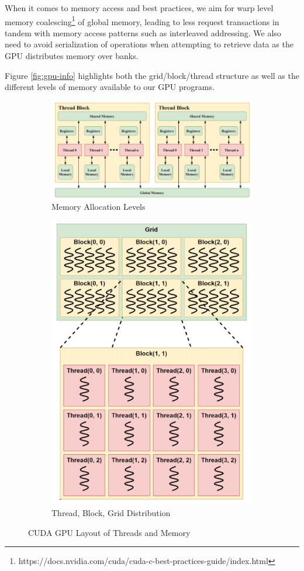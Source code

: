 \documentclass[11pt]{article}       %
\begin{document}
When it comes to memory access and best practices, we aim for warp level memory coalescing\footnote{https://docs.nvidia.com/cuda/cuda-c-best-practices-guide/index.html} of global memory, leading to less request transactions in tandem with memory access patterns such as interleaved addressing. We also need to avoid serialization of operations when attempting to retrieve data as the GPU distributes memory over banks. 

Figure \ref{fig:gpu-info} highlights both the grid/block/thread structure as well as the different levels of memory available to our GPU programs.

\begin{figure}
\begin{subfigure}{.5\textwidth}
  \centering
  \includegraphics[width=.8\linewidth]{Figures/grid_block_mem.png}  
  \caption{Memory Allocation Levels}
  \label{fig:mem-allocation}
\end{subfigure}
\begin{subfigure}{.5\textwidth}
  \centering
  \includegraphics[width=.8\linewidth]{Figures/grid_block_thread.png}  
  \caption{Thread, Block, Grid Distribution}
  \label{fig:mutation}
\end{subfigure}
\caption{CUDA GPU Layout of Threads and Memory}
\label{fig:cgpu-info}
\end{figure}
\end{document}
